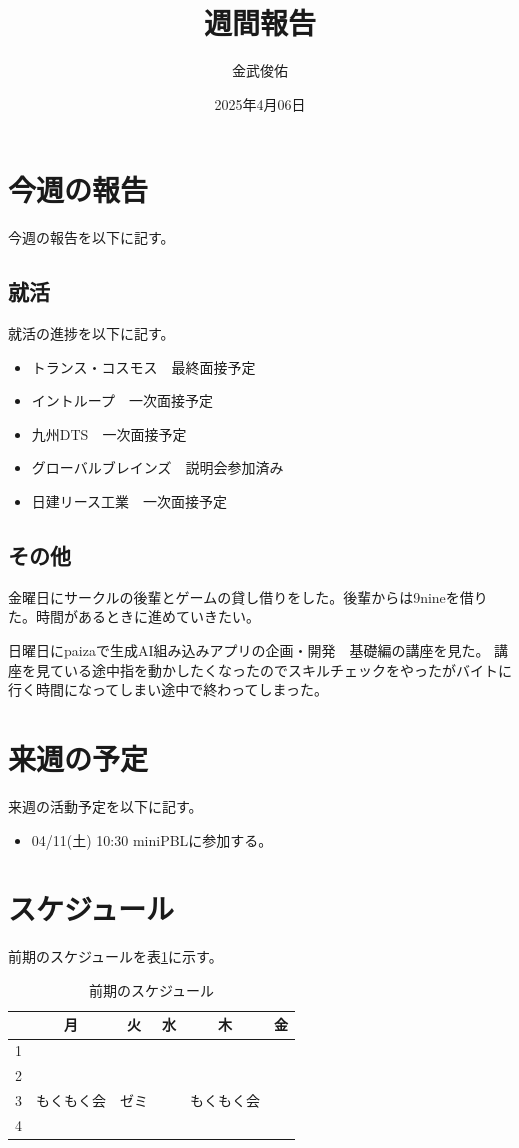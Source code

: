 \documentclass[a4paper,12pt]{ujarticle}
\title{週間報告}
\author{金武俊佑}
\date{2025年4月06日}
\newcommand{\thc}[1]{\multicolumn{1}{c|}{#1}}
\begin{document}
\maketitle

\section{今週の報告}\label{sec:thisweek}
今週の報告を以下に記す。
\subsection{就活}\label{sec:job}
就活の進捗を以下に記す。
\begin{itemize}
  \item トランス・コスモス　最終面接予定
  \item イントループ　一次面接予定
  \item 九州DTS　一次面接予定
  \item グローバルブレインズ　説明会参加済み
  \item 日建リース工業　一次面接予定
\end{itemize}
\subsection{その他}\label{sec:other}
金曜日にサークルの後輩とゲームの貸し借りをした。後輩からは9nineを借りた。時間があるときに進めていきたい。


日曜日にpaizaで生成AI組み込みアプリの企画・開発　基礎編の講座を見た。
講座を見ている途中指を動かしたくなったのでスキルチェックをやったがバイトに行く時間になってしまい途中で終わってしまった。
\section{来週の予定}\label{sec:nextweek}
来週の活動予定を以下に記す。
\begin{itemize}
  \item 04/11(土) 10:30 miniPBLに参加する。
\end{itemize}


\section{スケジュール}\label{sec:schedule}
前期のスケジュールを表\ref{tab:studyschedule}に示す。

\begin{table}[H]
  \caption{前期のスケジュール}\label{tab:studyschedule}
  \centering
  \begin{tabular}{|p{4mm}||p{30mm}|p{30mm}|p{30mm}|p{30mm}|p{30mm}|}\hline
        & \thc{月} & \thc{火} & \thc{水} & \thc{木} & \thc{金} \\ \hline\hline
     1  &     &     &     &  &   \\ \hline
     2  &     &  &  &  &  \\ \hline
     3  & もくもく会  & ゼミ &  &もくもく会  &  \\ \hline
     4  &  &  & &  & \\ \hline
  \end{tabular}
\end{table}
\end{document}
